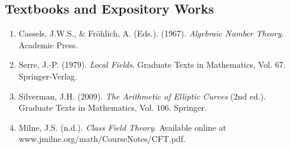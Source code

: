 \subsection*{Textbooks and Expository Works}
\begin{enumerate}
    \item Cassels, J.W.S., \& Fröhlich, A. (Eds.). (1967). \textit{Algebraic Number Theory}. Academic Press.
    \item Serre, J.-P. (1979). \textit{Local Fields}. Graduate Texts in Mathematics, Vol. 67. Springer-Verlag.
    \item Silverman, J.H. (2009). \textit{The Arithmetic of Elliptic Curves} (2nd ed.). Graduate Texts in Mathematics, Vol. 106. Springer.
    \item Milne, J.S. (n.d.). \textit{Class Field Theory}. Available online at www.jmilne.org/math/CourseNotes/CFT.pdf.
\end{enumerate}
